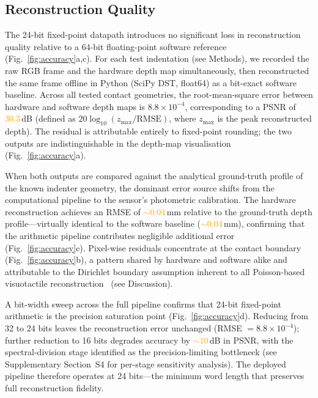 \documentclass[10pt,a4paper]{article}
\newcommand{\placeholder}[1]{\textcolor{orange}{#1}}
\newcommand{\rmseFxFl}{8.8 \times 10^{-4}}           %
\newcommand{\psnrTF}{\placeholder{30.3}}              %
\begin{document}
\subsection*{Reconstruction Quality} 

The 24-bit fixed-point datapath introduces no significant loss in reconstruction quality relative to a 64-bit floating-point software reference (Fig.~\ref{fig:accuracy}a,c). For each test indentation (see Methods), we recorded the raw RGB frame and the hardware depth map simultaneously, then reconstructed the same frame offline in Python (SciPy DST, float64) as a bit-exact software baseline. 
Across all tested contact geometries, the root-mean-square error between hardware and software depth maps is $\rmseFxFl$, corresponding to a PSNR of \psnrTF\,dB (defined as $20\log_{10}(z_\mathrm{max}/\mathrm{RMSE})$, where $z_\mathrm{max}$ is the peak reconstructed depth). The residual is attributable entirely to fixed-point rounding; the two outputs are indistinguishable in the depth-map visualisation (Fig.~\ref{fig:accuracy}a).

When both outputs are compared against the analytical ground-truth profile of the known indenter geometry, the dominant error source shifts from the computational pipeline to the sensor's photometric calibration. The hardware reconstruction achieves an RMSE of \placeholder{${\sim}0.04$}\,mm relative to the ground-truth depth profile---virtually identical to the software baseline (\placeholder{${\sim}0.04$}\,mm), confirming that the arithmetic pipeline contributes negligible additional error (Fig.~\ref{fig:accuracy}c). Pixel-wise residuals concentrate at the contact boundary (Fig.~\ref{fig:accuracy}b), a pattern shared by hardware and software alike and attributable to the Dirichlet boundary assumption inherent to all Poisson-based visuotactile reconstruction~\cite{yuan2017gelsight,li2014gelsight} (see Discussion).

A bit-width sweep across the full pipeline confirms that 24-bit fixed-point arithmetic is the precision saturation point (Fig.~\ref{fig:accuracy}d). Reducing from 32 to 24 bits leaves the reconstruction error unchanged (RMSE $= \rmseFxFl$); further reduction to 16 bits degrades accuracy by \placeholder{${\sim}10$}\,dB in PSNR, with the spectral-division stage identified as the precision-limiting bottleneck (see Supplementary Section~S4 for per-stage sensitivity analysis). The deployed pipeline therefore operates at 24 bits---the minimum word length that preserves full reconstruction fidelity.
\end{document}
